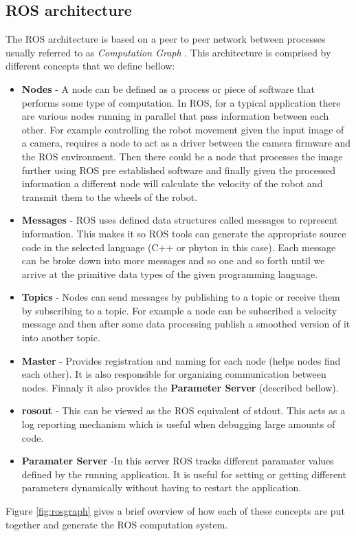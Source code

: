 \subsection{ROS architecture}
The \ac{ROS}  architecture is based on a peer to peer network between processes usually referred to as \textit{Computation Graph} \cite{packt}. This architecture is comprised by different concepts that we define bellow:
\begin{itemize}
\item \textbf{Nodes} - A node can be defined as a process or piece of software  that performs some type of computation. In \ac{ROS}, for a typical application there are various nodes running in parallel that pass information between each other. For example  controlling the robot movement given the input image of a camera,  requires a node to act as a driver between the camera firmware and the ROS environment. Then there could be a node that processes the image further using ROS pre established software and finally given the processed information a different node will calculate the velocity of the robot and transmit them to the wheels of the robot. 
\item \textbf{Messages} - \ac{ROS} uses defined data structures  called messages to represent information. This makes it so \ac{ROS} tools can generate the appropriate source code in the selected language (C++ or phyton in this case). Each message can be broke down into more messages and so one and so forth until we arrive at the primitive data types of the given programming language. 
\item \textbf{Topics} - 
Nodes can send messages by publishing to a topic or receive them by subscribing to a topic. For example a node can be subscribed a velocity message and then after some data processing publish a smoothed version of it into another topic.  
\item \textbf{Master} - Provides registration and naming for each node (helps nodes find each other). It is also responsible for organizing communication between nodes. Finnaly it also provides the \textbf{Parameter Server} (described bellow).
\item \textbf{rosout} - This can be viewed as the ROS equivalent of stdout. This acts as a log reporting mechanism which is useful when debugging large amounts of code.
\item \textbf{Paramater Server} -In this server \ac{ROS} tracks different paramater values defined by the running application. It is useful for setting or getting different parameters dynamically without having to restart the application.

\end{itemize}
Figure \ref{fig:rosgraph} gives a brief overview of how each of these concepts are put together and  generate the ROS  computation system.

